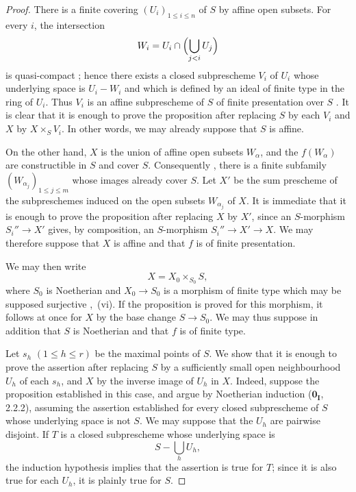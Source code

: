 \begin{proof}
There is a finite covering $(U_i)_{1\leq i\leq n}$ of $S$ by affine open subsets.  For every $i$, the intersection
\[
 W_i=U_i\cap\Bigl(\bigcup_{j<i}U_j\Bigr)
\]
is quasi-compact ; hence there exists a closed subprescheme $V_i$ of $U_i$ whose underlying space is $U_i-W_i$ and which is defined by an ideal of finite type in the ring of $U_i$.  Thus $V_i$ is an affine subprescheme of $S$ of finite presentation over $S$ .  It is clear that it is enough to prove the proposition after replacing $S$ by each $V_i$ and $X$ by $X\times_SV_i$.  In other words, we may already suppose that $S$ is affine.

On the other hand, $X$ is the union of affine open subsets $W_\alpha$, and the $f(W_\alpha)$ are constructible in $S$  and cover $S$.  Consequently , there is a finite subfamily $(W_{\alpha_j})_{1\leq j\leq m}$ whose images already cover $S$.  Let $X'$ be the sum prescheme of the subpreschemes induced on the open subsets $W_{\alpha_j}$ of $X$.  It is immediate that it is enough to prove the proposition after replacing $X$ by $X'$, since an $S$-morphism $S_i''\to X'$ gives, by composition, an $S$-morphism $S_i''\to X'\to X$.  We may therefore suppose that $X$ is affine and that $f$ is of finite presentation.

We may then write 
\[
 X=X_0\times_{S_0}S,
\]
where $S_0$ is Noetherian and $X_0\to S_0$ is a morphism of finite type which may be supposed surjective ,~(vi).  If the proposition is proved for this morphism, it follows at once for $X$ by the base change $S\to S_0$.  We may thus suppose in addition that $S$ is Noetherian and that $f$ is of finite type.

Let $s_h$ $(1\leq h\leq r)$ be the maximal points of $S$.  We show that it is enough to prove the assertion after replacing $S$ by a sufficiently small open neighbourhood $U_h$ of each $s_h$, and $X$ by the inverse image of $U_h$ in $X$.  Indeed, suppose the proposition established in this case, and argue by Noetherian induction ($\mathbf{0}_{\mathbf I}$, 2.2.2), assuming the assertion established for every closed subprescheme of $S$ whose underlying space is not $S$.  We may suppose that the $U_h$ are pairwise disjoint.  If $T$ is a closed subprescheme whose underlying space is
\[
 S-\bigcup_hU_h,
\]
the induction hypothesis implies that the assertion is true for $T$; since it is also true for each $U_h$, it is plainly true for $S$.


\end{proof}
